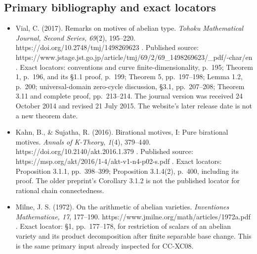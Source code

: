 \subsection{Primary bibliography and exact
locators}\label{primary-bibliography-and-exact-locators}

\begin{itemize}
\tightlist
\item
  Vial, C. (2017). Remarks on motives of abelian type. \emph{Tohoku
  Mathematical Journal, Second Series, 69}(2), 195--220.
  https://doi.org/10.2748/tmj/1498269623 . Published source:
  https://www.jstage.jst.go.jp/article/tmj/69/2/69\_1498269623/\_pdf/-char/en
  . Exact locators: conventions and curve finite-dimensionality, p.~195;
  Theorem 1, p.~196, and its §1.1 proof, p.~199; Theorem 5,
  pp.~197--198; Lemma 1.2, p.~200; universal-domain zero-cycle
  discussion, §3.1, pp.~207--208; Theorem 3.11 and complete proof,
  pp.~213--214. The journal version was received 24 October 2014 and
  revised 21 July 2015. The website's later release date is not a new
  theorem date.
\item
  Kahn, B., \& Sujatha, R. (2016). Birational motives, I: Pure
  birational motives. \emph{Annals of K-Theory, 1}(4), 379--440.
  https://doi.org/10.2140/akt.2016.1.379 . Published source:
  https://msp.org/akt/2016/1-4/akt-v1-n4-p02-s.pdf . Exact locators:
  Proposition 3.1.1, pp.~398--399; Proposition 3.1.4(2), p.~400,
  including its proof. The older preprint's Corollary 3.1.2 is not the
  published locator for rational chain connectedness.
\item
  Milne, J. S. (1972). On the arithmetic of abelian varieties.
  \emph{Inventiones Mathematicae, 17}, 177--190.
  https://www.jmilne.org/math/articles/1972a.pdf . Exact locator: §1,
  pp.~177--178, for restriction of scalars of an abelian variety and its
  product decomposition after finite separable base change. This is the
  same primary input already inspected for CC-XC08.
\end{itemize}
